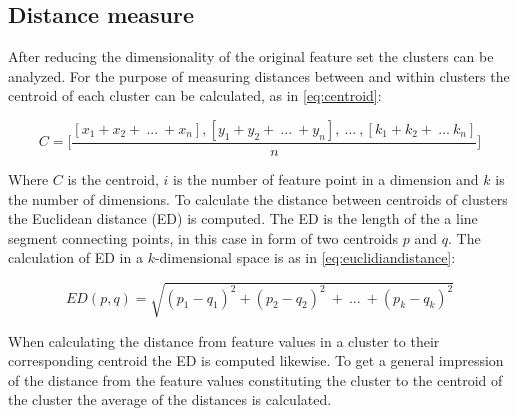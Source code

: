 \subsection{Distance measure} \label{sub:BG:distanceMeasure}
After reducing the dimensionality of the original feature set the clusters can be analyzed. For the purpose of measuring distances between and within clusters the centroid of each cluster can be calculated, as in \eqref{eq:centroid}:

\begin{equation} \label{eq:centroid}
	C = \Bigg[ \frac{[x_1+x_2 +~...~+ x_n],[y_1+y_2 +~...~+ y_n] ,~...~,[k_1+k_2 +~...~k_n]}{n} \Bigg]
\end{equation}

Where $C$ is the centroid, $i$ is the number of feature point in a dimension and $k$ is the number of dimensions. To calculate the distance between centroids of clusters the Euclidean distance (ED) is computed. The ED is the length of the a line segment connecting points, in this case in form of two centroids $p$ and $q$. The calculation of ED in a $k$-dimensional space is as in \eqref{eq:euclidiandistance}:

\begin{equation} \label{eq:euclidiandistance}
	ED(p,q) = \sqrt{(p_1-q_1)^2 + (p_2-q_2)^2~+~...~+ (p_k-q_k)^2}
\end{equation} 

When calculating the distance from feature values in a cluster to their corresponding centroid the ED is computed likewise. To get a general impression of the distance from the feature values constituting the cluster to the centroid of the cluster the average of the distances is calculated. 






